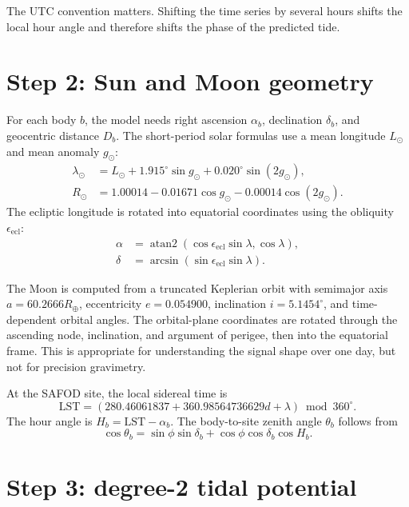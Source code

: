 \documentclass[11pt]{article}
\newcommand{\Rearth}{R_{\oplus}}
\begin{document}
The UTC convention matters.  Shifting the time series by several hours shifts
the local hour angle and therefore shifts the phase of the predicted tide.

\section{Step 2: Sun and Moon geometry}

For each body $b$, the model needs right ascension $\alpha_b$, declination
$\delta_b$, and geocentric distance $D_b$.  The short-period solar formulas
use a mean longitude $L_\odot$ and mean anomaly $g_\odot$:
\begin{align}
  \lambda_\odot &= L_\odot
    +1.915^\circ\sin g_\odot+0.020^\circ\sin(2g_\odot),\\
  R_\odot &= 1.00014-0.01671\cos g_\odot
    -0.00014\cos(2g_\odot).
\end{align}
The ecliptic longitude is rotated into equatorial coordinates using the
obliquity $\epsilon_{\mathrm{ecl}}$:
\begin{align}
  \alpha &= \operatorname{atan2}\!\left(\cos\epsilon_{\mathrm{ecl}}\sin\lambda,
                    \cos\lambda\right),\\
  \delta &= \arcsin\!\left(\sin\epsilon_{\mathrm{ecl}}\sin\lambda\right).
\end{align}

The Moon is computed from a truncated Keplerian orbit with semimajor axis
$a=60.2666\Rearth$, eccentricity $e=0.054900$, inclination
$i=5.1454^\circ$, and time-dependent orbital angles.  The orbital-plane
coordinates are rotated through the ascending node, inclination, and
argument of perigee, then into the equatorial frame.  This is appropriate for
understanding the signal shape over one day, but not for precision gravimetry.

At the SAFOD site, the local sidereal time is
\begin{equation}
  \mathrm{LST} =
  \left(280.46061837+360.98564736629d+\lambda\right)\bmod 360^\circ.
\end{equation}
The hour angle is $H_b=\mathrm{LST}-\alpha_b$.  The body-to-site zenith angle
$\theta_b$ follows from
\begin{equation}
  \cos\theta_b =
  \sin\phi\sin\delta_b
  +\cos\phi\cos\delta_b\cos H_b.
\end{equation}

\section{Step 3: degree-2 tidal potential}
\end{document}
